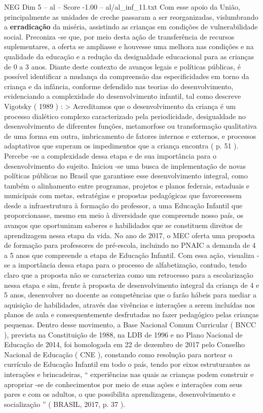 \begin{textsample}{NEG Dim 5 – al – Score -1.00 – al/al\_inf\_11.txt}
Com esse apoio da União, principalmente as unidades de creche passaram a ser reorganizadas, vislumbrando a \textbf{erradicação} da miséria, assistindo as crianças em condições de vulnerabilidade social.
Preconiza -se que, por meio desta ação de transferência de recursos suplementares, a oferta se ampliasse e houvesse uma melhora nas condições e na qualidade da educação e a redução da desigualdade educacional para as crianças de 0 a 3 anos.
Diante deste contexto de avanços legais e políticas públicas, é possível identificar a mudança da compreensão das especificidades em torno da criança e da infância, conforme defendido nas teorias do desenvolvimento, evidenciando a complexidade do desenvolvimento infantil, tal como descreve Vigotsky ( 1989 ) : > Acreditamos que o desenvolvimento da criança é um processo dialético complexo caracterizado pela periodicidade, desigualdade no desenvolvimento de diferentes funções, metamorfose ou transformação qualitativa de uma forma em outra, imbricamento de fatores internos e externos, e processos adaptativos que superam os impedimentos que a criança encontra ( p. 51 ).
Percebe -se a complexidade dessa etapa e de sua importância para o desenvolvimento do sujeito.
Iniciou -se uma busca de implementação de novas políticas públicas no Brasil que garantisse esse desenvolvimento integral, como também o alinhamento entre programas, projetos e planos federais, estaduais e municipais com metas, estratégias e propostas pedagógicas que favorecessem desde a infraestrutura à formação do professor, a uma Educação Infantil que proporcionasse, mesmo em meio à diversidade que compreende nosso país, os avanços que oportunizam saberes e habilidades que se constituem direitos de aprendizagem nessa etapa da vida.
No ano de 2017, o MEC oferta uma proposta de formação para professores de pré-escola, incluindo no PNAIC a demanda de 4 a 5 anos que compreende a etapa de Educação Infantil.
Com essa ação, visualiza -se a importância dessa etapa para o processo de alfabetização, contudo, tendo claro que a proposta não se caracteriza como um retrocesso para a escolarização nessa etapa e sim, frente à proposta de desenvolvimento integral da criança de 4 e 5 anos, desenvolver no docente as competências que o farão hábeis para mediar a aquisição de habilidades, através das vivências e interações a serem incluídas nos planos de aula e consequentemente desfrutadas no fazer pedagógico pelas crianças pequenas.
Dentro desse movimento, a Base Nacional Comum Curricular ( BNCC ), prevista na Constituição de 1988, na LDB de 1996 e no Plano Nacional de Educação de 2014, foi homologada em 22 de dezembro de 2017 pelo Conselho Nacional de Educação ( CNE ), constando como resolução para nortear o currículo de Educação Infantil em todo o país, tendo por eixos estruturantes as interações e brincadeiras, “ experiências nas quais as crianças podem construir e apropriar -se de conhecimentos por meio de suas ações e interações com seus pares e com os adultos, o que possibilita aprendizagens, desenvolvimento e socialização ” ( BRASIL, 2017, p. 37 ).

\end{textsample}
